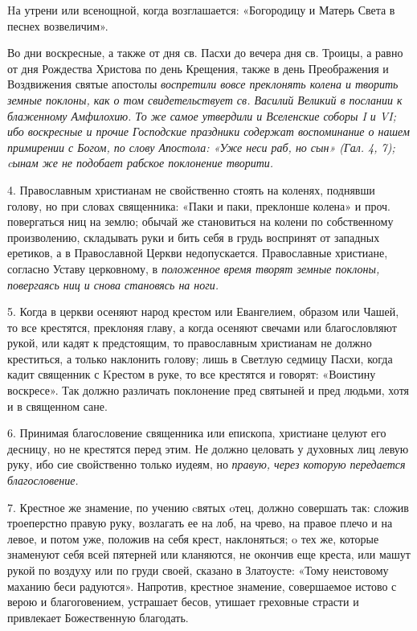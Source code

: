 Hа утрени или всенощной, когда возглашается: «Богородицу и Матерь Света в песнех возвеличим». 



Во дни воскресные, а также от дня св. Пасхи до вечера дня св. Троицы, а равно от дня Рождества Христова по день Крещения, также в день Преображения и Воздвижения святые апостолы \itshape воспретили\normalfont{} вовсе преклонять колена и творить \itshape земные\normalfont{} поклоны, как о том свидетельствует св. Василий Великий в послании к блаженному Амфилохию. То же самое утвердили и Вселенские соборы I и VI; ибо воскресные и прочие Господские праздники содержат воспоминание о нашем примирении с Богом, по слову Апостола: «Уже неси раб, но сын» (Гал. 4, 7); cынам же не подобает рабское поклонение творити. 



4. Православным христианам не свойственно стоять на коленях, поднявши голову, но при словах священника: «Паки и паки, преклонше колена» и проч. повергаться ниц на землю; обычай же становиться на колени по собственному произволению, складывать руки и бить себя в грудь воспринят от западных еретиков, а в Православной Церкви недопускается. Православные христиане, согласно Уставу церковному, в \itshape положенное\normalfont{} время творят земные поклоны, повергаясь ниц и снова становясь на ноги. 



5. Когда в церкви осеняют народ крестом или Евангелием, образом или Чашей, то все крестятся, преклоняя главу, а когда осеняют свечами или благословляют рукой, или кадят к предстоящим, то православным христианам не должно креститься, а только наклонить голову; лишь в Светлую седмицу Пасхи, когда кадит священник с Kрестом в руке, то все крестятся и говорят: «Воистину воскресе». Так должно различать поклонение пред святыней и пред людьми, хотя и в священном сане. 



6. Принимая благословение священника или епископа, христиане целуют его десницу, но не крестятся перед этим. Не должно целовать у духовных лиц левую руку, ибо сие свойственно только иудеям, но \itshape правую\normalfont{}, через которую передается благословение. 



7. Крестное же знамение, по учению cвятых oтец, должно совершать так: сложив троеперстно правую руку, возлагать ее на лоб, на чрево, на правое плечо и на левое, и потом уже, положив на себя крест, наклоняться;  o тех же, которые знаменуют себя всей пятерней или кланяются, не окончив еще креста, или машут рукой по воздуху или по груди своей, сказано в Златоусте: «Тому неистовому маханию беси радуются». Напротив, крестное знамение, совершаемое истово с верою и благоговением, устрашает бесов, утишает греховные страсти и привлекает Божественную благодать. 





